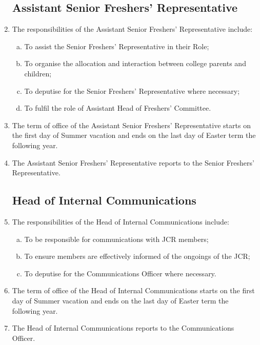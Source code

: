 \documentclass[12pt]{article}
\begin{document}
\begin{enumerate}
    \subsection{Assistant Senior Freshers' Representative}
    \item The responsibilities of the Assistant Senior Freshers' Representative include:
    \begin{enumerate}[(a)]
        \item To assist the Senior Freshers' Representative in their Role;
        \item To organise the allocation and interaction between college parents and children;
        \item To deputise for the Senior Freshers' Representative where necessary;
        \item To fulfil the role of Assistant Head of Freshers' Committee.
    \end{enumerate}
    \item The term of office of the Assistant Senior Freshers' Representative starts on the first day of Summer vacation and ends on the last day of Easter term the following year.
    \item The Assistant Senior Freshers' Representative reports to the Senior Freshers' Representative.

    \subsection{Head of Internal Communications}
    \item The responsibilities of the Head of Internal Communications include:
    \begin{enumerate} [(a)]
        \item To be responsible for communications with JCR members;
        \item  To ensure members are effectively informed of the ongoings of the JCR;
        \item To deputise for the Communications Officer where necessary.
    \end{enumerate}
    \item The term of office of the Head of Internal Communications starts on the first day of Summer vacation and ends on the last day of Easter term the following year.
    \item The Head of Internal Communications reports to the Communications Officer.


\end{enumerate}
\end{document}
